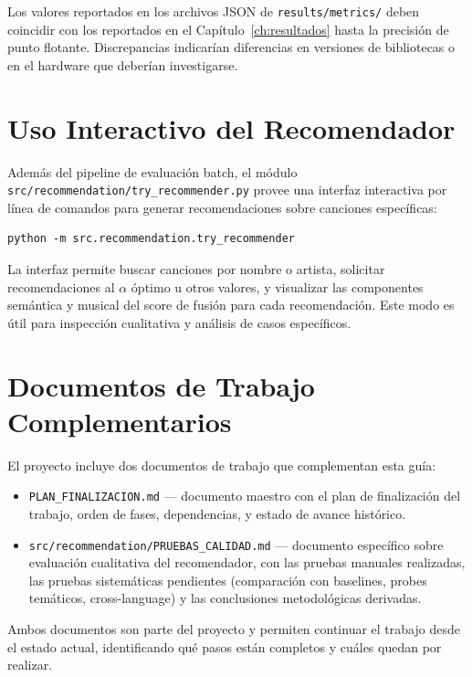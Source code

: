 Los valores reportados en los archivos JSON de \texttt{results/metrics/} deben coincidir con los reportados en el Capítulo~\ref{ch:resultados} hasta la precisión de punto flotante. Discrepancias indicarían diferencias en versiones de bibliotecas o en el hardware que deberían investigarse.

\section{Uso Interactivo del Recomendador}

Además del pipeline de evaluación batch, el módulo \texttt{src/recommendation/try\_recommender.py} provee una interfaz interactiva por línea de comandos para generar recomendaciones sobre canciones específicas:

\begin{verbatim}
python -m src.recommendation.try_recommender
\end{verbatim}

La interfaz permite buscar canciones por nombre o artista, solicitar recomendaciones al $\alpha$ óptimo u otros valores, y visualizar las componentes semántica y musical del score de fusión para cada recomendación. Este modo es útil para inspección cualitativa y análisis de casos específicos.

\section{Documentos de Trabajo Complementarios}

El proyecto incluye dos documentos de trabajo que complementan esta guía:

\begin{itemize}[leftmargin=2em]
    \item \texttt{PLAN\_FINALIZACION.md} --- documento maestro con el plan de finalización del trabajo, orden de fases, dependencias, y estado de avance histórico.
    \item \texttt{src/recommendation/PRUEBAS\_CALIDAD.md} --- documento específico sobre evaluación cualitativa del recomendador, con las pruebas manuales realizadas, las pruebas sistemáticas pendientes (comparación con baselines, probes temáticos, cross-language) y las conclusiones metodológicas derivadas.
\end{itemize}

Ambos documentos son parte del proyecto y permiten continuar el trabajo desde el estado actual, identificando qué pasos están completos y cuáles quedan por realizar.
